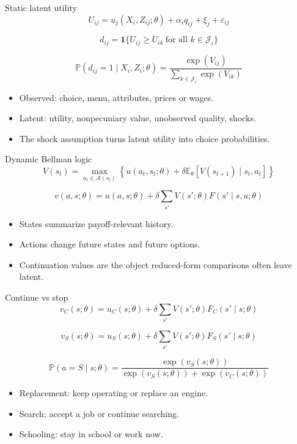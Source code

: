 \documentclass[aspectratio=169,11pt]{beamer}
\newcommand{\E}{\mathbb{E}}
\newcommand{\1}{\mathbf{1}}
\newcommand{\Prb}{\mathbb{P}}
\begin{document}
\begin{frame}{Static latent utility}
\[
U_{ij}
=
u_j(X_i,Z_{ij};\theta)
+ \alpha_i q_{ij}
+ \xi_j
+ \varepsilon_{ij}
\]

\[
d_{ij}
=
\1\{U_{ij}\ge U_{ik}\ \text{for all }k\in\mathcal J_i\}
\]

\[
\Prb(d_{ij}=1\mid X_i,Z_i;\theta)
=
\frac{\exp(V_{ij})}
{\sum_{k\in\mathcal J_i}\exp(V_{ik})}
\]

\begin{itemize}
    \item Observed: choice, menu, attributes, prices or wages.
    \item Latent: utility, nonpecuniary value, unobserved quality, shocks.
    \item The shock assumption turns latent utility into choice probabilities.
\end{itemize}
\end{frame}

\begin{frame}{Dynamic Bellman logic}
\[
V(s_t)
=
\max_{a_t\in\mathcal A(s_t)}
\left\{
u(a_t,s_t;\theta)
+
\delta\E_{\theta}
\left[
V(s_{t+1})\mid s_t,a_t
\right]
\right\}
\]

\[
v(a,s;\theta)
=
u(a,s;\theta)
+
\delta\sum_{s'}V(s';\theta)F(s'\mid s,a;\theta)
\]

\begin{itemize}
    \item States summarize payoff-relevant history.
    \item Actions change future states and future options.
    \item Continuation values are the object reduced-form comparisons often leave latent.
\end{itemize}
\end{frame}

\begin{frame}{Continue vs stop}
\[
v_C(s;\theta)
=
u_C(s;\theta)
+
\delta\sum_{s'}V(s';\theta)F_C(s'\mid s;\theta)
\]

\[
v_S(s;\theta)
=
u_S(s;\theta)
+
\delta\sum_{s'}V(s';\theta)F_S(s'\mid s;\theta)
\]

\[
\Prb(a=S\mid s;\theta)
=
\frac{\exp(v_S(s;\theta))}
{\exp(v_S(s;\theta))+\exp(v_C(s;\theta))}
\]

\begin{itemize}
    \item Replacement: keep operating or replace an engine.
    \item Search: accept a job or continue searching.
    \item Schooling: stay in school or work now.
\end{itemize}
\end{frame}
\end{document}
